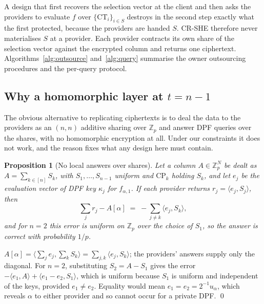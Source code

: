 \documentclass[a4paper,fleqn]{cas-sc}
\newtheorem{proposition}{Proposition}
\begin{document}
A design that first recovers the selection vector at the client and then asks
the providers to evaluate $f$ over $\{\text{CT}_i\}_{i\in S}$ destroys in the
second step exactly what the first protected, because the providers are handed
$S$. CR-SHE therefore never materialises $S$ at a provider. Each provider
contracts its own share of the selection vector against the encrypted column
and returns one ciphertext. Algorithms~\ref{alg:outsource} and~\ref{alg:query}
summarise the owner outsourcing procedures and the per-query protocol.

\subsection{Why a homomorphic layer at $t=n-1$}
\label{sec:whyrep}
The obvious alternative to replicating ciphertexts is to deal the data to the
providers as an $(n,n)$ additive sharing over $\mathbb{Z}_p$ and answer DPF
queries over the shares, with no homomorphic encryption at all. Under our
constraints it does not work, and the reason fixes what any design here must
contain.

\begin{proposition}[No local answers over shares]
\label{prop:nolocal}
Let a column $A\in\mathbb{Z}_p^N$ be dealt as $A=\sum_{k\in[n]}S_k$, with
$S_1,\dots,S_{n-1}$ uniform and $\text{CP}_k$ holding $S_k$, and let $e_j$ be
the evaluation vector of DPF key $\kappa_j$ for $f_{\alpha,1}$. If each
provider returns $r_j=\langle e_j,S_j\rangle$, then
\[
\textstyle\sum_{j} r_j - A[\alpha] \;=\; -\sum_{j\neq k}\langle e_j,S_k\rangle ,
\]
and for $n=2$ this error is uniform on $\mathbb{Z}_p$ over the choice of
$S_1$, so the answer is correct with probability $1/p$.
\end{proposition}
\begin{pf}
$A[\alpha]=\langle\sum_j e_j,\sum_k S_k\rangle=\sum_{j,k}\langle e_j,S_k\rangle$;
the providers' answers supply only the diagonal. For $n=2$, substituting
$S_2=A-S_1$ gives the error $-\langle e_1,A\rangle+\langle e_1-e_2,S_1\rangle$,
which is uniform because $S_1$ is uniform and independent of the keys, provided
$e_1\neq e_2$. Equality would mean $e_1=e_2=2^{-1}u_\alpha$, which reveals
$\alpha$ to either provider and so cannot occur for a private DPF. \qed
\end{pf}
\end{document}
